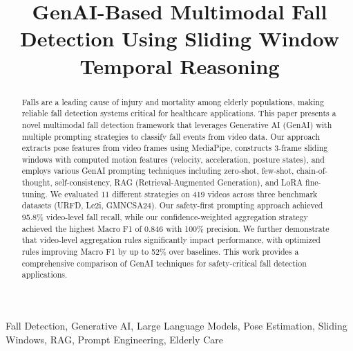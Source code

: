\documentclass[conference]{IEEEtran}
\begin{document}
\title{GenAI-Based Multimodal Fall Detection Using Sliding Window Temporal Reasoning}

\author{
}

\maketitle

\begin{abstract}
Falls are a leading cause of injury and mortality among elderly populations, making reliable fall detection systems critical for healthcare applications. This paper presents a novel multimodal fall detection framework that leverages Generative AI (GenAI) with multiple prompting strategies to classify fall events from video data. Our approach extracts pose features from video frames using MediaPipe, constructs 3-frame sliding windows with computed motion features (velocity, acceleration, posture states), and employs various GenAI prompting techniques including zero-shot, few-shot, chain-of-thought, self-consistency, RAG (Retrieval-Augmented Generation), and LoRA fine-tuning. We evaluated 11 different strategies on 419 videos across three benchmark datasets (URFD, Le2i, GMNCSA24). Our safety-first prompting approach achieved 95.8\% video-level fall recall, while our confidence-weighted aggregation strategy achieved the highest Macro F1 of 0.846 with 100\% precision. We further demonstrate that video-level aggregation rules significantly impact performance, with optimized rules improving Macro F1 by up to 52\% over baselines. This work provides a comprehensive comparison of GenAI techniques for safety-critical fall detection applications.
\end{abstract}

\begin{IEEEkeywords}
Fall Detection, Generative AI, Large Language Models, Pose Estimation, Sliding Windows, RAG, Prompt Engineering, Elderly Care
\end{IEEEkeywords}
\end{document}
